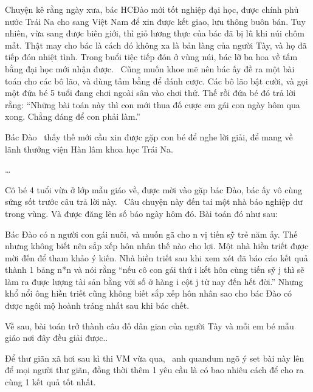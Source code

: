Chuyện kê rằng ngày xưa, bác HCĐào mới tốt nghiệp đại học, được chính phủ nước Trái Na cho sang Việt Nam để xin được kết giao, lưu thông buôn bán. Tuy nhiên, vừa sang được biên giới, thì giỏ lương thực của bác đã bị lũ khi núi chôm mất. Thật may cho bác là cách đó không xa là bản làng của người Tày, và họ đã tiếp đón nhiệt tình. Trong buổi tiệc tiếp đón ở vùng núi, bác lỡ ba hoa về tấm bằng đại học mới nhận được.  Cũng muốn khoe mẽ nên bác ấy đề ra một bài toán cho các bô lão, và dùng tấm bằng để đánh cược. Các bô lão bật cười, và gọi một đứa bé 5 tuổi đang chơi ngoài sân vào chơi thử. Thế rồi đứa bé đó trả lời rằng: “Những bài toán này thì con mới thua đố cược em gái con ngày hôm qua xong. Chẳng đáng để con phải làm.”  

   Bác Đào  thấy thế mới cầu xin được gặp con bé để nghe lời giải, để mang về lãnh thưởng viện Hàn lâm khoa học Trái Na.  

   …  

   Cô bé 4 tuổi vừa ở lớp mẫu giáo về, được mời vào gặp bác Đào, bác ấy vô cùng sửng sốt trước câu trả lời này.  Câu chuyện này đến tai một nhà báo nghiệp dư trong vùng. Và được đăng lên số báo ngày hôm đó. Bài toán đó như sau:  

   Bác Đào có n người con gái nuôi, và muốn gã cho n vị tiến sỹ trẻ năm ấy. Thế nhưng không biết nên sắp xếp hôn nhân thế nào cho lợi. Một nhà hiền triết được mời đến để tham khảo ý kiến. Nhà hiền triết sau khi xem xét đã báo cáo kết quả thành 1 bảng n*n và nói rằng “nếu cô con gái thứ i kết hôn cùng tiến sỹ j thì sẽ làm ra được lượng tài sản bằng với số ở hàng i cột j từ nay đến hết đời.” Nhưng khổ nổi ông hiền triết cũng không biết sắp xếp hôn nhân sao cho bác Đào có được ngôi mộ hoành tráng nhất sau khi bác chết.  



   Về sau, bài toán trở thành câu đố dân gian của người Tày và mỗi em bé mẫu giáo nơi đây đều giải được..  



   Để thư giãn xã hơi sau kì thi VM vừa qua,  anh quandum ngõ ý set bài này lên để mọi người thư giãn, đồng thời thêm 1 yêu cầu là có bao nhiêu cách để cho ra cùng 1 kết quả tốt nhất.